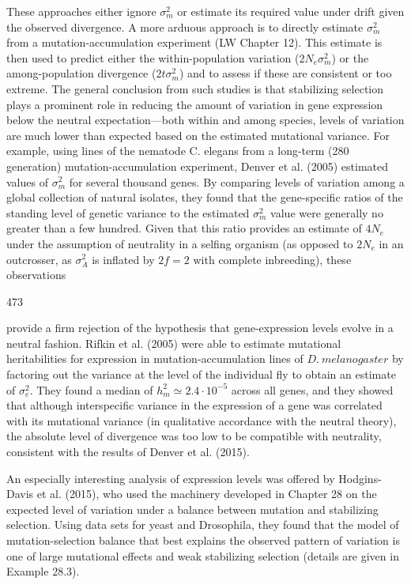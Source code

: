 \documentclass{article}
\begin{document}
These approaches either ignore $\sigma_m^2$ or estimate its required value under drift given the observed divergence. A more arduous approach is to directly estimate $\sigma_m^2$ from a mutation-accumulation experiment (LW Chapter 12). This estimate is then used to predict either the within-population variation ($2N_e\sigma_m^2$) or the among-population divergence ($2t\sigma_m^2$) and to assess if these are consistent or too extreme. The general conclusion from such studies is that stabilizing selection plays a prominent role in reducing the amount of variation in gene expression below the neutral expectation—both within and among species, levels of variation are much lower than expected based on the estimated mutational variance. For example, using lines of the nematode C. elegans from a long-term (280 generation) mutation-accumulation experiment, Denver et al. (2005) estimated values of $\sigma_m^2$ for several thousand genes. By comparing levels of variation among a global collection of natural isolates, they found that the gene-specific ratios of the standing level of genetic variance to the estimated $\sigma_m^2$ value were generally no greater than a few hundred. Given that this ratio provides an estimate of $4N_e$ under the assumption of neutrality in a selfing organism (as opposed to $2N_e$ in an outcrosser, as $\sigma_A^2$ is inflated by $2f=2$ with complete inbreeding), these observations

473

provide a firm rejection of the hypothesis that gene-expression levels evolve in a neutral fashion. Rifkin et al. (2005) were able to estimate mutational heritabilities for expression in mutation-accumulation lines of  $ D.\ melanogaster $ by factoring out the variance at the level of the individual fly to obtain an estimate of  $ \sigma_e^2 $. They found a median of  $ h_m^2 \simeq 2.4 \cdot 10^{-5} $ across all genes, and they showed that although interspecific variance in the expression of a gene was correlated with its mutational variance (in qualitative accordance with the neutral theory), the absolute level of divergence was too low to be compatible with neutrality, consistent with the results of Denver et al. (2015).

An especially interesting analysis of expression levels was offered by Hodgins-Davis et al. (2015), who used the machinery developed in Chapter 28 on the expected level of variation under a balance between mutation and stabilizing selection. Using data sets for yeast and Drosophila, they found that the model of mutation-selection balance that best explains the observed pattern of variation is one of large mutational effects and weak stabilizing selection (details are given in Example 28.3).
\end{document}
